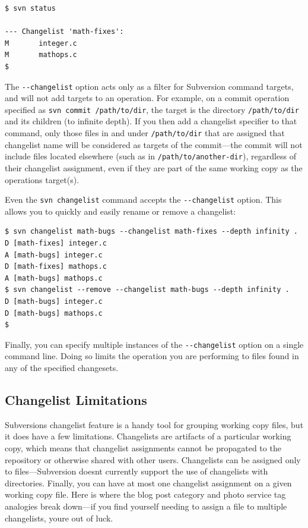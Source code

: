 \begin{verbatim}
$ svn status

--- Changelist 'math-fixes':
M       integer.c
M       mathops.c
$
\end{verbatim}

The \texttt{-\/-changelist} option acts only as a filter for Subversion
command targets, and will not add targets to an operation. For example,
on a commit operation specified as \texttt{svn\ commit\ /path/to/dir},
the target is the directory \texttt{/path/to/dir} and its children (to
infinite depth). If you then add a changelist specifier to that command,
only those files in and under \texttt{/path/to/dir} that are assigned
that changelist name will be considered as targets of the commit---the
commit will not include files located elsewhere (such as in
\texttt{/path/to/another-dir}), regardless of their changelist
assignment, even if they are part of the same working copy as the
operation\textquotesingle s target(s).

Even the \texttt{svn\ changelist} command accepts the
\texttt{-\/-changelist} option. This allows you to quickly and easily
rename or remove a changelist:

\begin{verbatim}
$ svn changelist math-bugs --changelist math-fixes --depth infinity .
D [math-fixes] integer.c
A [math-bugs] integer.c
D [math-fixes] mathops.c
A [math-bugs] mathops.c
$ svn changelist --remove --changelist math-bugs --depth infinity .
D [math-bugs] integer.c
D [math-bugs] mathops.c
$
\end{verbatim}

Finally, you can specify multiple instances of the
\texttt{-\/-changelist} option on a single command line. Doing so limits
the operation you are performing to files found in any of the specified
changesets.

\subsection{Changelist
Limitations}\label{svn.advanced.changelists.limitations}

Subversion\textquotesingle s changelist feature is a handy tool for
grouping working copy files, but it does have a few limitations.
Changelists are artifacts of a particular working copy, which means that
changelist assignments cannot be propagated to the repository or
otherwise shared with other users. Changelists can be assigned only to
files---Subversion doesn\textquotesingle t currently support the use of
changelists with directories. Finally, you can have at most one
changelist assignment on a given working copy file. Here is where the
blog post category and photo service tag analogies break down---if you
find yourself needing to assign a file to multiple changelists,
you\textquotesingle re out of luck.

